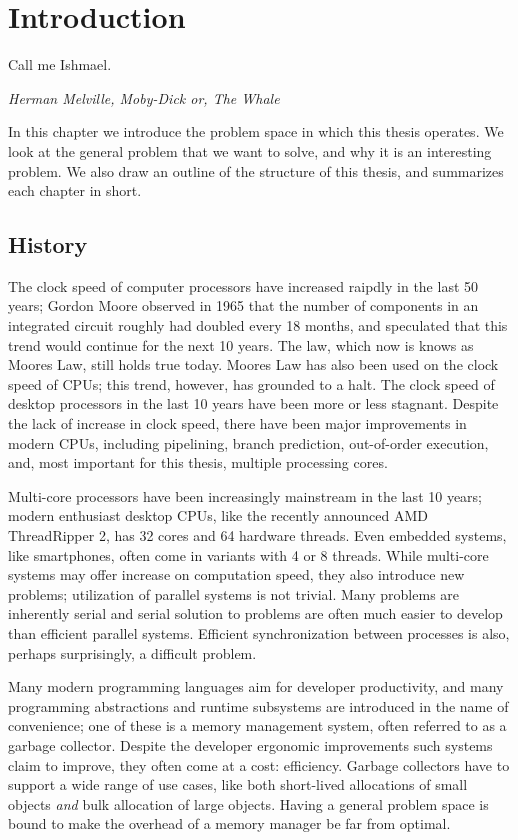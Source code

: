 \chapter{Introduction}

\epigraph{Call me Ishmael.}{\textit{Herman Melville, Moby-Dick or, The Whale}}

In this chapter we introduce the problem space in which this thesis operates.
We look at the general problem that we want to solve, and why it is an interesting problem.
We also draw an outline of the structure of this thesis, and summarizes each chapter in short.

\clearpage



\section{History}


The clock speed of computer processors have increased raipdly in the last 50 years; Gordon Moore
observed in 1965 that the number of components in an integrated circuit roughly had doubled every
18 months, and speculated that this trend would continue for the next 10 years.  The law, which now
is knows as Moores Law, still holds true today.  Moores Law has also been used on the clock speed
of CPUs; this trend, however, has grounded to a halt. The clock speed of desktop processors in the
last 10 years have been more or less stagnant.  Despite the lack of increase in clock speed, there
have been major improvements in modern CPUs, including pipelining, branch prediction, out-of-order
execution, and, most important for this thesis, multiple processing cores.


Multi-core processors have been increasingly mainstream in the last 10 years; modern enthusiast
desktop CPUs, like the recently announced AMD ThreadRipper 2, has 32 cores and 64 hardware threads.
Even embedded systems, like smartphones, often come in variants with 4 or 8 threads. While
multi-core systems may offer increase on computation speed, they also introduce new problems;
utilization of parallel systems is not trivial. Many problems are inherently serial and serial
solution to problems are often much easier to develop than efficient parallel systems.  Efficient
synchronization between processes is also, perhaps surprisingly, a difficult problem.


Many modern programming languages aim for developer productivity, and many programming abstractions and
runtime subsystems are introduced in the name of convenience; one of these is a memory management
system, often referred to as a garbage collector. Despite the developer ergonomic improvements such
systems claim to improve, they often come at a cost: efficiency. Garbage collectors have to support
a wide range of use cases, like both short-lived allocations of small objects \emph{and} bulk
allocation of large objects. Having a general problem space is bound to make the overhead of a
memory manager be far from optimal.



